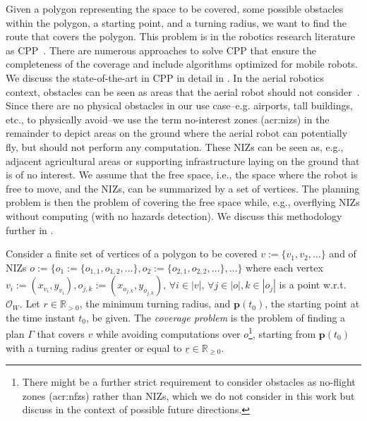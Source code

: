 Given a polygon representing the space to be covered, some possible obstacles within the polygon, a starting point, and a turning radius, we want to find the route that covers the polygon. This problem is in the robotics research literature as CPP~\citep{choset1998coverage,choset2001coverage,galceran2013survey}. There are numerous approaches to solve CPP that ensure the completeness of the coverage and include algorithms optimized for mobile robots. We discuss the state-of-the-art in CPP in detail in . In the aerial robotics context, obstacles can be seen as areas that the aerial robot should not consider~\citep{cabreira2019survey}. Since there are no physical obstacles in our use case--e.g. airports, tall buildings, etc., to physically avoid--we use the term no-interest zones (\Gls{acr:niz}s) in the remainder to depict areas on the ground where the aerial robot can potentially fly, but should not perform any computation. These NIZs can be seen as, e.g., adjacent agricultural areas or supporting infrastructure laying on the ground that is of no interest. We assume that the free space, i.e., the space where the robot is free to move, and the NIZs, can be summarized by a set of vertices. The planning problem is then the problem of covering the free space while, e.g., overflying NIZs without computing (with no hazards detection). We discuss this methodology further in .

\begin{pb}
  \label{pb:cov-pb}
  Consider a finite set of vertices of a polygon to be covered $v:=\{v_1,v_2,\dots\}$ and of NIZs $o:=\{o_1:=\{o_{1,1},o_{1,2},\dots\},o_2:=\{o_{2,1},o_{2,2},\dots\},\dots\}$ where each vertex $v_i:=(x_{v_i},y_{v_i}),o_{j,k}:=(x_{o_{j,k}},y_{o_{j,k}}),\,\forall i\in|v|,\,\forall j\in|o|,k\in|o_j|$ is a point w.r.t. $\mathcal{O}_W$. Let $r\in\mathbb{R}_{>0}$, the minimum turning radius, and $\mathbf{p}(t_0)$, the starting point at the time instant $t_0$, be given. The \emph{coverage problem} is the problem of finding a plan $\Gamma$ that covers $v$ while avoiding computations over $o$\footnote{There might be a further strict requirement to consider obstacles as no-flight zones (\Gls{acr:nfz}s) rather than NIZs, which we do not consider in this work but discuss in the context of possible future directions.}, starting from $\mathbf{p}(t_0)$ with a turning radius greater or equal to $\underline{r}\in\mathbb{R}_{\geq 0}$.
\end{pb}    


